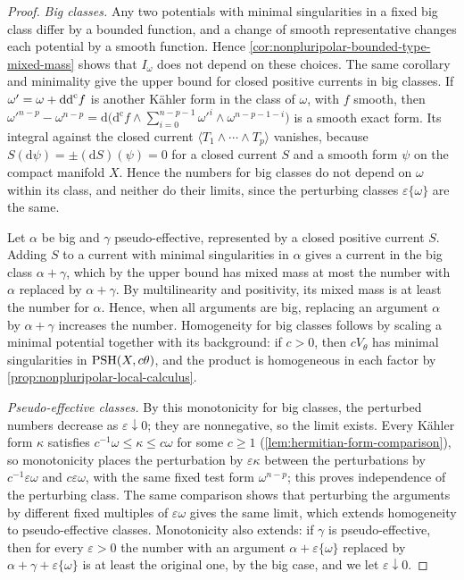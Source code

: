 \begin{proof}
\emph{Big classes.} Any two potentials with minimal singularities in a fixed big class differ by a bounded function, and a change of smooth representative changes each potential by a smooth function. Hence \cref{cor:nonpluripolar-bounded-type-mixed-mass} shows that $I_\omega$ does not depend on these choices. The same corollary and minimality give the upper bound for closed positive currents in big classes. If $\omega'=\omega+\mathrm{dd}^{\mathrm{c}} f$ is another K\"ahler form in the class of $\omega$, with $f$ smooth, then $\omega'^{n-p}-\omega^{n-p}=\mathrm d\bigl(\mathrm d^{\mathrm c}f\wedge\sum_{i=0}^{n-p-1}\omega'^i\wedge\omega^{n-p-1-i}\bigr)$ is a smooth exact form. Its integral against the closed current $\langle T_1\wedge\cdots\wedge T_p\rangle$ vanishes, because $S(\mathrm d\psi)=\pm(\mathrm dS)(\psi)=0$ for a closed current $S$ and a smooth form $\psi$ on the compact manifold $X$. Hence the numbers for big classes do not depend on $\omega$ within its class, and neither do their limits, since the perturbing classes $\varepsilon\{\omega\}$ are the same.

Let $\alpha$ be big and $\gamma$ pseudo-effective, represented by a closed positive current $S$. Adding $S$ to a current with minimal singularities in $\alpha$ gives a current in the big class $\alpha+\gamma$, which by the upper bound has mixed mass at most the number with $\alpha$ replaced by $\alpha+\gamma$. By multilinearity and positivity, its mixed mass is at least the number for $\alpha$. Hence, when all arguments are big, replacing an argument $\alpha$ by $\alpha+\gamma$ increases the number. Homogeneity for big classes follows by scaling a minimal potential together with its background: if $c>0$, then $cV_\theta$ has minimal singularities in $\mathrm{PSH}(X,c\theta)$, and the product is homogeneous in each factor by \cref{prop:nonpluripolar-local-calculus}.

\emph{Pseudo-effective classes.} By this monotonicity for big classes, the perturbed numbers decrease as $\varepsilon\downarrow0$; they are nonnegative, so the limit exists. Every K\"ahler form $\kappa$ satisfies $c^{-1}\omega\leq\kappa\leq c\omega$ for some $c\geq1$ (\cref{lem:hermitian-form-comparison}), so monotonicity places the perturbation by $\varepsilon\kappa$ between the perturbations by $c^{-1}\varepsilon\omega$ and $c\varepsilon\omega$, with the same fixed test form $\omega^{n-p}$; this proves independence of the perturbing class. The same comparison shows that perturbing the arguments by different fixed multiples of $\varepsilon\omega$ gives the same limit, which extends homogeneity to pseudo-effective classes. Monotonicity also extends: if $\gamma$ is pseudo-effective, then for every $\varepsilon>0$ the number with an argument $\alpha+\varepsilon\{\omega\}$ replaced by $\alpha+\gamma+\varepsilon\{\omega\}$ is at least the original one, by the big case, and we let $\varepsilon\downarrow0$.


\end{proof}

